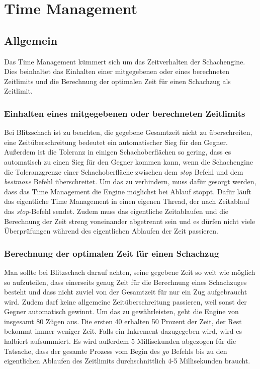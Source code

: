 \def \citeGameMode[#1]{\cite[#1]{gameMode}}
\section{Time Management}\label{sec:timeMan}
\subsection{Allgemein}
Das Time Management kümmert sich um das Zeitverhalten der Schachengine. Dies beinhaltet
das Einhalten einer mitgegebenen oder eines berechneten Zeitlimits und die Berechnung der optimalen Zeit für einen Schachzug als Zeitlimit.

\subsubsection{Einhalten eines mitgegebenen oder berechneten Zeitlimits}
Bei Blitzschach ist zu beachten, die gegebene Gesamtzeit nicht zu überschreiten, eine Zeitüberschreitung bedeutet ein automatischer Sieg für den Gegner.\newline
Außerdem ist die Toleranz in einigen Schachoberfl\"achen so gering, dass es automatisch zu einen Sieg f\"ur den Gegner kommen kann, wenn die Schachengine die Toleranzgrenze einer Schachoberfl\"ache zwischen dem \textit{stop} Befehl und dem \textit{bestmove} Befehl \"uberschreitet. \cite[0]{tctolerance}
\newline Um das zu verhindern, muss dafür gesorgt werden, dass das Time Management die Engine möglichst bei Ablauf stoppt. Dafür läuft das eigentliche Time Management in einen eigenen Thread, der nach Zeitablauf das \textit{stop}-Befehl sendet. Zudem muss das eigentliche Zeitablaufen und die Berechnung der Zeit streng voneinander abgetrennt sein und es d\"urfen nicht viele \"Uberpr\"ufungen  w\"ahrend des eigentlichen Ablaufen der Zeit passieren.

\subsubsection{Berechnung der optimalen Zeit für einen Schachzug}
Man sollte bei Blitzschach darauf achten, seine gegebene Zeit so weit wie möglich so aufzuteilen, dass einerseits genug Zeit für die Berechnung eines Schachzuges besteht und dass nicht zuviel von der Gesamtzeit für nur ein Zug aufgebraucht wird. Zudem darf keine allgemeine Zeitüberschreitung passieren, weil sonst der Gegner automatisch gewinnt. 
\newline Um das zu gewährleisten, geht die Engine von insgesamt 80 Zügen aus. Die ersten 40 erhalten 50 Prozent der Zeit, der Rest bekommt immer weniger Zeit. Falls ein Inkrement dazugegeben wird, wird es halbiert aufsummiert. 
\newline Es wird außerdem 5 Millisekunden abgezogen f\"ur die Tatsache, dass der gesamte Prozess vom Begin des \textit{go} Befehls bis zu den eigentlichen Ablaufen des Zeitlimits durchschnittlich 4-5 Millisekunden braucht.

